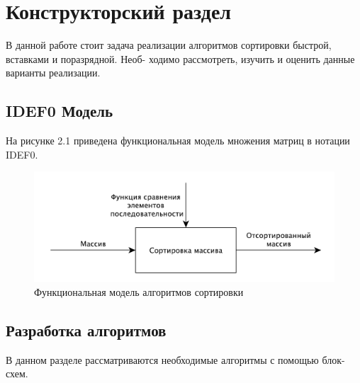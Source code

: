 \graphicspath{{pict}}

\chapter{Конструкторский раздел}
\label{cha:design}

В данной работе стоит задача реализации алгоритмов сортировки быстрой, вставками и поразрядной. Необ-
ходимо рассмотреть, изучить и оценить данные варианты реализации.

\section{IDEF0 Модель}

На рисунке 2.1 приведена функциональная модель множения матриц в нотации IDEF0.
\begin{figure}
\centering
\includegraphics[scale=1]{./pictures/idef0.pdf}
\caption{Функциональная модель алгоритмов сортировки}
\end{figure}

\section{Разработка алгоритмов}
В данном разделе рассматриваются необходимые алгоритмы с помощью блок-схем.
